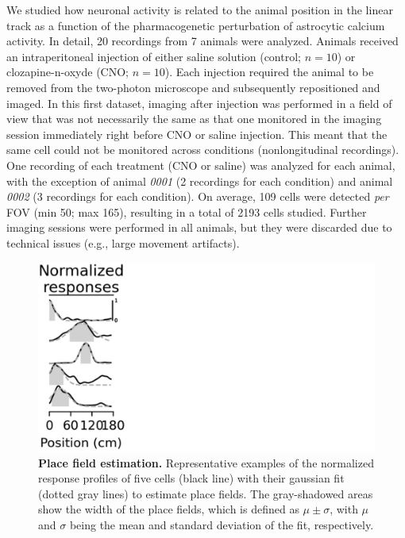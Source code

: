 We studied how neuronal activity is related to the animal position in the linear track as a function of the pharmacogenetic perturbation of astrocytic calcium activity.
In detail, 20 recordings from 7 animals were analyzed. 
Animals received an intraperitoneal injection of either saline solution (control; $n = 10$) or clozapine-n-oxyde (CNO; $n = 10$). 
Each injection required the animal to be removed from the two-photon microscope and subsequently repositioned and imaged. In this first dataset, imaging after injection was performed in a field of view that was not necessarily the same as that one monitored in the imaging session immediately right before CNO or saline injection. 
This meant that the same cell could not be monitored across conditions (nonlongitudinal recordings).
One recording of each treatment (CNO or saline) was analyzed for each animal, with the exception of animal \textit{0001} (2 recordings for each condition) and animal \textit{0002} (3 recordings for each condition).
On average, 109 cells were detected \textit{per} FOV (min 50; max 165), resulting in a total of 2193 cells studied.
Further imaging sessions were performed in all animals, but they were discarded due to technical issues (e.g., large movement artifacts). 
\begin{figure}
    \includegraphics[trim={0 0 710 0},clip,width=.3\textwidth]{Figures/Chapter4/pf_gaussian_fitting.pdf}
    \caption[Place field estimation]{\textbf{Place field estimation.} Representative examples of the normalized response profiles of five cells (black line) with their gaussian fit (dotted gray lines) to estimate place fields. 
    The gray-shadowed areas show the width of the place fields, which is defined as $\mu \pm \sigma$, with $\mu$ and $\sigma$ being the mean and standard deviation of the fit, respectively.}
    \label{fig:chap4:pf_gaussian_fitting}
\end{figure}


